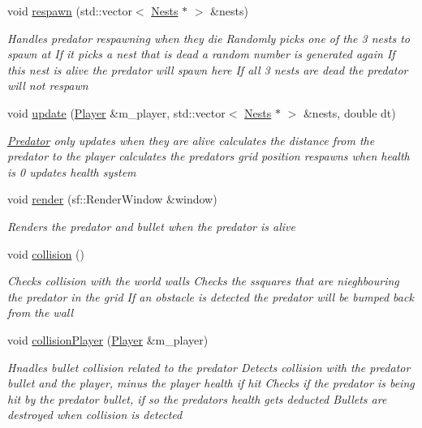\begin{DoxyCompactItemize}
void \mbox{\hyperlink{class_predator_acf5250b053f3680563a40d8b7ae3c383}{respawn}} (std\+::vector$<$ \mbox{\hyperlink{class_nests}{Nests}} $\ast$ $>$ \&nests)
\begin{DoxyCompactList}\small\item\em Handles predator respawning when they die Randomly picks one of the 3 nests to spawn at If it picks a nest that is dead a random number is generated again If this nest is alive the predator will spawn here If all 3 nests are dead the predator will not respawn \end{DoxyCompactList}\item 
void \mbox{\hyperlink{class_predator_a56dd513f17d7a3e4f3504d44b3deb3c0}{update}} (\mbox{\hyperlink{class_player}{Player}} \&m\+\_\+player, std\+::vector$<$ \mbox{\hyperlink{class_nests}{Nests}} $\ast$ $>$ \&nests, double dt)
\begin{DoxyCompactList}\small\item\em \mbox{\hyperlink{class_predator}{Predator}} only updates when they are alive calculates the distance from the predator to the player calculates the predators grid position respawns when health is 0 updates health system \end{DoxyCompactList}\item 
void \mbox{\hyperlink{class_predator_acf84bdda5a2ad7120ae182fbeac59516}{render}} (sf\+::\+Render\+Window \&window)
\begin{DoxyCompactList}\small\item\em Renders the predator and bullet when the predator is alive \end{DoxyCompactList}\item 
void \mbox{\hyperlink{class_predator_aefe19fc634893644a2a4244dda82ad9c}{collision}} ()
\begin{DoxyCompactList}\small\item\em Checks collision with the world walls Checks the ssquares that are nieghbouring the predator in the grid If an obstacle is detected the predator will be bumped back from the wall \end{DoxyCompactList}\item 
void \mbox{\hyperlink{class_predator_a69c268f1736c04f1bea413a71e087fe4}{collision\+Player}} (\mbox{\hyperlink{class_player}{Player}} \&m\+\_\+player)
\begin{DoxyCompactList}\small\item\em Hnadles bullet collision related to the predator Detects collision with the predator bullet and the player, minus the player health if hit Checks if the predator is being hit by the predator bullet, if so the predators health gets deducted Bullets are destroyed when collision is detected \end{DoxyCompactList}\item 

\end{DoxyCompactItemize}
